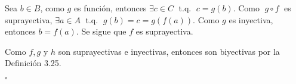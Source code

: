 \documentclass[letterpaper,11pt]{article}
\begin{document}
\begin{adjustwidth}{1cm}{0cm}
\begin{enumerate}[(a)]
        Sea $b \in B$, como $g$ es función, entonces $\exists c \in C \;$ t.q. $\; c = g(b)$. \newline
        Como $\; g \circ f \;$ es suprayectiva, $\exists a \in A \;$ t.q. $\; g(b) = c = g(f(a))$. \newline
        Como $g$ es inyectiva, entonces $b = f(a)$. \newline
        Se sigue que $f$ es suprayectiva. \newline

        Como $f, g$ y $h$ son suprayectivas e inyectivas, entonces son biyectivas por la Definición 3.25. \newline

        \begin{flushright}
          $\square$
        \end{flushright}

    \end{enumerate}
  \end{adjustwidth}
\end{document}
